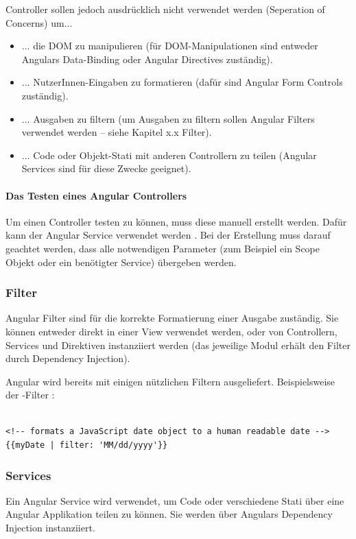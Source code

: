 Controller sollen jedoch ausdrücklich nicht verwendet werden (Seperation of Concerns) um...
\begin{itemize}
  \item ... die DOM zu manipulieren (für DOM-Manipulationen sind entweder Angulars Data-Binding oder Angular Directives zuständig).
  \item ... NutzerInnen-Eingaben zu formatieren (dafür sind Angular Form Controls \autocite{Angular:Forms} zuständig).
  \item ... Ausgaben zu filtern (um Ausgaben zu filtern sollen Angular Filters verwendet werden -- siehe Kapitel x.x Filter).
  \item ... Code oder Objekt-Stati mit anderen Controllern zu teilen (Angular Services sind für diese Zwecke geeignet).
\end{itemize}

\paragraph{Das Testen eines Angular Controllers}
Um einen Controller testen zu können, muss diese manuell erstellt werden. Dafür kann der Angular Service  verwendet werden \autocite{Angular:ControllerTest}. Bei der Erstellung muss darauf geachtet werden, dass alle notwendigen Parameter (zum Beispiel ein Scope Objekt oder ein benötigter Service) übergeben werden.

\subsubsection{Filter}
Angular Filter sind für die korrekte Formatierung einer Ausgabe zuständig. Sie können entweder direkt in einer View verwendet werden, oder von Controllern, Services und Direktiven instanziiert werden (das jeweilige Modul erhält den Filter durch Dependency Injection).

Angular wird bereits mit einigen nützlichen Filtern ausgeliefert. Beispielsweise der -Filter \autocite{Angular:FilterDate}:

\begin{lstlisting}

<!-- formats a JavaScript date object to a human readable date -->
{{myDate | filter: 'MM/dd/yyyy'}}

\end{lstlisting}

\subsubsection{Services}
Ein Angular Service wird verwendet, um Code oder verschiedene Stati über eine Angular Applikation teilen zu können. Sie werden über Angulars Dependency Injection instanziiert.

